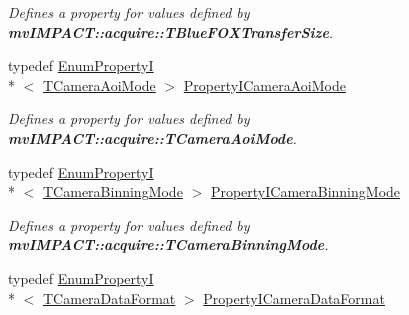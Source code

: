 \begin{DoxyCompactItemize}
\begin{DoxyCompactList}\small\item\em Defines a property for values defined by {\bfseries mv\+I\+M\+P\+A\+C\+T\+::acquire\+::\+T\+Blue\+F\+O\+X\+Transfer\+Size}. \end{DoxyCompactList}\item 
\hypertarget{group___device_specific_interface_gac3481ade98270de3d8aa7ae47cbe5c4e}{typedef \hyperlink{classmv_i_m_p_a_c_t_1_1acquire_1_1_enum_property_i}{Enum\+Property\+I}\\*
$<$ \hyperlink{group___device_specific_interface_gaab13c0272df6eebe71ee4b8f45796cd3}{T\+Camera\+Aoi\+Mode} $>$ \hyperlink{group___device_specific_interface_gac3481ade98270de3d8aa7ae47cbe5c4e}{Property\+I\+Camera\+Aoi\+Mode}}\label{group___device_specific_interface_gac3481ade98270de3d8aa7ae47cbe5c4e}

\begin{DoxyCompactList}\small\item\em Defines a property for values defined by {\bfseries mv\+I\+M\+P\+A\+C\+T\+::acquire\+::\+T\+Camera\+Aoi\+Mode}. \end{DoxyCompactList}\item 
\hypertarget{group___device_specific_interface_ga416d63b8d5d2dd2e5fabd253db5f8efc}{typedef \hyperlink{classmv_i_m_p_a_c_t_1_1acquire_1_1_enum_property_i}{Enum\+Property\+I}\\*
$<$ \hyperlink{group___device_specific_interface_ga915d7e18807e69567ac466541b66313b}{T\+Camera\+Binning\+Mode} $>$ \hyperlink{group___device_specific_interface_ga416d63b8d5d2dd2e5fabd253db5f8efc}{Property\+I\+Camera\+Binning\+Mode}}\label{group___device_specific_interface_ga416d63b8d5d2dd2e5fabd253db5f8efc}

\begin{DoxyCompactList}\small\item\em Defines a property for values defined by {\bfseries mv\+I\+M\+P\+A\+C\+T\+::acquire\+::\+T\+Camera\+Binning\+Mode}. \end{DoxyCompactList}\item 
\hypertarget{group___device_specific_interface_gaca0c18e83412eef14a2be9fdc89066b6}{typedef \hyperlink{classmv_i_m_p_a_c_t_1_1acquire_1_1_enum_property_i}{Enum\+Property\+I}\\*
$<$ \hyperlink{group___common_interface_ga36f9b405563c51f817554819cf981699}{T\+Camera\+Data\+Format} $>$ \hyperlink{group___device_specific_interface_gaca0c18e83412eef14a2be9fdc89066b6}{Property\+I\+Camera\+Data\+Format}}\label{group___device_specific_interface_gaca0c18e83412eef14a2be9fdc89066b6}


\end{DoxyCompactItemize}
